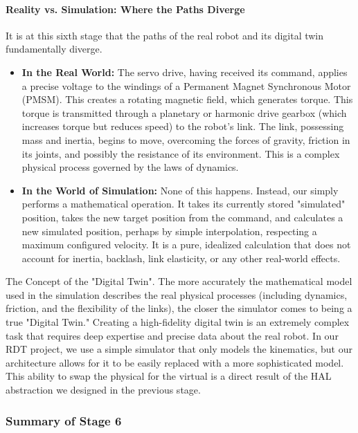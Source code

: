 \paragraph{Reality vs. Simulation: Where the Paths Diverge}
It is at this sixth stage that the paths of the real robot and its digital twin fundamentally diverge.

\begin{itemize}
    \item \textbf{In the Real World:} The servo drive, having received its command, applies a precise voltage to the windings of a Permanent Magnet Synchronous Motor (PMSM). This creates a rotating magnetic field, which generates torque. This torque is transmitted through a planetary or harmonic drive gearbox (which increases torque but reduces speed) to the robot's link. The link, possessing mass and inertia, begins to move, overcoming the forces of gravity, friction in its joints, and possibly the resistance of its environment. This is a complex physical process governed by the laws of dynamics.
    
    \item \textbf{In the World of Simulation:} None of this happens. Instead, our  simply performs a mathematical operation. It takes its currently stored "simulated" position, takes the new target position from the command, and calculates a new simulated position, perhaps by simple interpolation, respecting a maximum configured velocity. It is a pure, idealized calculation that does not account for inertia, backlash, link elasticity, or any other real-world effects.
\end{itemize}

\begin{tipbox}{The Concept of the "Digital Twin".}
    The more accurately the mathematical model used in the simulation describes the real physical processes (including dynamics, friction, and the flexibility of the links), the closer the simulator comes to being a true "Digital Twin." Creating a high-fidelity digital twin is an extremely complex task that requires deep expertise and precise data about the real robot. In our RDT project, we use a simple simulator that only models the kinematics, but our architecture allows for it to be easily replaced with a more sophisticated model. This ability to swap the physical for the virtual is a direct result of the HAL abstraction we designed in the previous stage.
\end{tipbox}

\subsubsection{Summary of Stage 6}
\label{subsubsec:stage6_summary}


